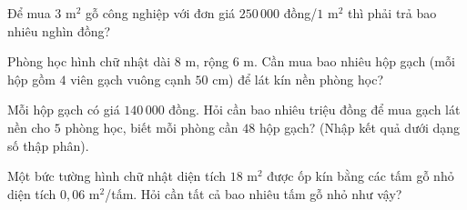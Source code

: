 \begin{ex} %
Để mua $3\text{ m}^2$ gỗ công nghiệp với đơn giá $250\,000$ đồng/$1\text{ m}^2$ thì phải trả bao nhiêu nghìn đồng?
\end{ex}

\begin{ex} %
Phòng học hình chữ nhật dài $8\text{ m}$, rộng $6\text{ m}$. Cần mua bao nhiêu hộp gạch (mỗi hộp gồm $4$ viên gạch vuông cạnh $50\text{ cm}$) để lát kín nền phòng học?
\end{ex}

\begin{ex} %
Mỗi hộp gạch có giá $140\,000$ đồng. Hỏi cần bao nhiêu triệu đồng để mua gạch lát nền cho $5$ phòng học, biết mỗi phòng cần $48$ hộp gạch? (Nhập kết quả dưới dạng số thập phân).
\end{ex}

\begin{ex} %
Một bức tường hình chữ nhật diện tích $18\text{ m}^2$ được ốp kín bằng các tấm gỗ nhỏ diện tích $0{,}06\text{ m}^2$/tấm. Hỏi cần tất cả bao nhiêu tấm gỗ nhỏ như vậy?
\end{ex}
